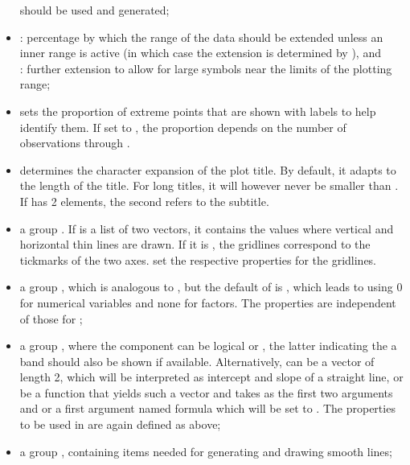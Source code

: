 \documentclass[11pt]{article}
\begin{document}
\begin{itemize}
  should be used and generated;
\item
  : percentage by which the range of the data should be
  extended unless an inner range is active (in which case the extension 
  is determined by ), and\\
  : further extension to allow for large symbols near the 
  limits of the plotting range;
\item
   sets the proportion of extreme points that are shown 
  with labels to help identify them.
  If set to , the proportion depends on the number  of
  observations through .
\item
   determines the character expansion of the plot title.
  By default, it adapts to the length of the title.
  For long titles, it will however never be smaller than
  . 
  If  has 2 elements, the second refers to the subtitle.
\item
  a group . If  is a list of two vectors,
  it contains the values where vertical and horizontal thin lines are drawn.
  If it is , the gridlines correspond to the tickmarks of the
  two axes.
   set the respective
  properties for the gridlines.
\item
  a group , which is analogous to , but the
  default of  is , which leads to using 
  0 for numerical variables and none for factors. 
  The properties are independent of those for ;
\item
  a group , where the component  can be logical 
  or ,
  the latter indicating the a band should also be shown if available.
  Alternatively,  can be a vector of length 2, which will be
  interpreted as intercept and slope of a straight line, or be
  a function that yields such a vector and takes as the first two 
  arguments  and  or a first argument named formula which 
  will be set to .
  The properties  to be used in 
  are again defined as above;
\item
  a group , containing items needed for generating and drawing
  smooth lines;
  \label{options.smooth}

\end{itemize}
\end{document}
